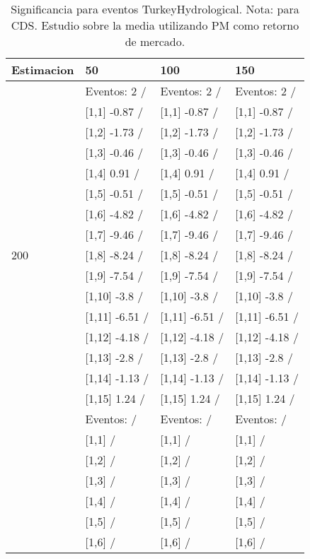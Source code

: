 \begin{table}

\caption{Significancia para eventos TurkeyHydrological. Nota: para CDS. Estudio sobre la media utilizando PM como retorno de mercado.}
\centering
\begin{tabular}[t]{llll}
\toprule
Estimacion & 50 & 100 & 150\\
\midrule
 & Eventos:  2 / & Eventos:  2 / & Eventos:  2 /\\
 & {}[1,1] -0.87  / & {}[1,1] -0.87  / & {}[1,1] -0.87  /\\
 & {}[1,2] -1.73  / & {}[1,2] -1.73  / & {}[1,2] -1.73  /\\
 & {}[1,3] -0.46  / & {}[1,3] -0.46  / & {}[1,3] -0.46  /\\
 & {}[1,4] 0.91  / & {}[1,4] 0.91  / & {}[1,4] 0.91  /\\
\addlinespace
 & {}[1,5] -0.51  / & {}[1,5] -0.51  / & {}[1,5] -0.51  /\\
 & {}[1,6] -4.82  / & {}[1,6] -4.82  / & {}[1,6] -4.82  /\\
 & {}[1,7] -9.46  / & {}[1,7] -9.46  / & {}[1,7] -9.46  /\\
200 & {}[1,8] -8.24  / & {}[1,8] -8.24  / & {}[1,8] -8.24  /\\
 & {}[1,9] -7.54  / & {}[1,9] -7.54  / & {}[1,9] -7.54  /\\
\addlinespace
 & {}[1,10] -3.8  / & {}[1,10] -3.8  / & {}[1,10] -3.8  /\\
 & {}[1,11] -6.51  / & {}[1,11] -6.51  / & {}[1,11] -6.51  /\\
 & {}[1,12] -4.18  / & {}[1,12] -4.18  / & {}[1,12] -4.18  /\\
 & {}[1,13] -2.8  / & {}[1,13] -2.8  / & {}[1,13] -2.8  /\\
 & {}[1,14] -1.13  / & {}[1,14] -1.13  / & {}[1,14] -1.13  /\\
\addlinespace
 & {}[1,15] 1.24  / & {}[1,15] 1.24  / & {}[1,15] 1.24  /\\
 & Eventos:   / & Eventos:   / & Eventos:   /\\
 & {}[1,1]  / & {}[1,1]  / & {}[1,1]  /\\
 & {}[1,2]  / & {}[1,2]  / & {}[1,2]  /\\
 & {}[1,3]  / & {}[1,3]  / & {}[1,3]  /\\
\addlinespace
 & {}[1,4]  / & {}[1,4]  / & {}[1,4]  /\\
 & {}[1,5]  / & {}[1,5]  / & {}[1,5]  /\\
 & {}[1,6]  / & {}[1,6]  / & {}[1,6]  /\\

\end{tabular}
\end{table}
